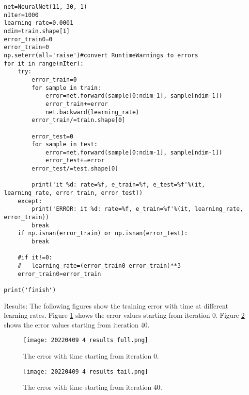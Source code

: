 \documentclass[10pt]{article}
\begin{document}
\begin{tiny}
\begin{verbatim}
net=NeuralNet(11, 30, 1)
nIter=1000
learning_rate=0.0001
ndim=train.shape[1]
error_train0=0
error_train=0
np.seterr(all='raise')#convert RuntimeWarnings to errors
for it in range(nIter):
    try:
        error_train=0
        for sample in train:
            error=net.forward(sample[0:ndim-1], sample[ndim-1])
            error_train+=error
            net.backward(learning_rate)
        error_train/=train.shape[0]
        
        error_test=0
        for sample in test:
            error=net.forward(sample[0:ndim-1], sample[ndim-1])
            error_test+=error
        error_test/=test.shape[0]
        
        print('it %d: rate=%f, e_train=%f, e_test=%f'%(it, learning_rate, error_train, error_test))
    except:
        print('ERROR: it %d: rate=%f, e_train=%f'%(it, learning_rate, error_train))
        break
    if np.isnan(error_train) or np.isnan(error_test):
        break
    
    #if it!=0:
    #   learning_rate=(error_train0-error_train)**3
    error_train0=error_train

print('finish')
\end{verbatim}
\end{tiny}

Results:
The following figures show the training error with time at different learning rates. Figure \ref{fig:image1} shows the error values starting from iteration 0. Figure \ref{fig:image2} shows the error values starting from iteration 40.
\begin{figure}[p]
\texttt{[image: 20220409 4 results full.png]}
\caption[]{The error with time starting from iteration 0.}
\label{fig:image1}
\end{figure}
\begin{figure}[p]
\texttt{[image: 20220409 4 results tail.png]}
\caption[]{The error with time starting from iteration 40.}
\label{fig:image2}
\end{figure}
\end{document}
